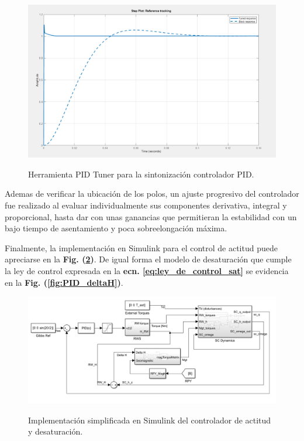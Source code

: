 \begin{figure}[!h]
	\begin{center}
		\includegraphics[scale=0.32]{imagenes/controladores/PID_tuning2.PNG}\\
	\end{center}
	\caption{Herramienta PID Tuner para la sintonización controlador PID.}
	\label{fig:PID_tuner}	 	
\end{figure}

Ademas de verificar la ubicación de los polos, un ajuste progresivo del controlador fue realizado al evaluar individualmente sus componentes derivativa, integral y proporcional, hasta dar con unas ganancias que permitieran la estabilidad con un bajo tiempo de asentamiento y poca sobreelongación máxima. 

Finalmente, la implementación en Simulink para el control de actitud puede apreciarse en la \textbf{Fig. (\ref{fig:PID})}. De igual forma el modelo de desaturación que cumple la ley de control expresada en la \textbf{ecn. \eqref{eq:ley_de_control_sat}} se evidencia en la \textbf{Fig. (\ref{fig:PID_deltaH})}.

\begin{figure}[!ht]
	\begin{center}
		\includegraphics[scale=0.37]{imagenes/controladores/PID.PNG}\\
	\end{center}
	\caption{Implementación simplificada en Simulink del controlador de actitud y desaturación.}
	\label{fig:PID}	 	
\end{figure}

